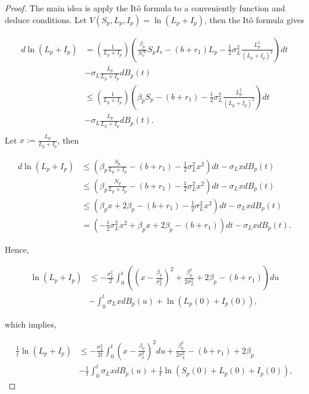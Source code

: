 \begin{proof}
	The main idea is apply the It\^{o} formula to a conveniently function and deduce conditions. Let $V(S_p,L_p,I_p)=\ln(L_p+I_p)$, then the It\^{o} formula gives
	
		\begin{align*}
			d \ln(L_p+I_p) 
				&=
					\left(\frac{1}{L_p+I_p}\right)\left(\frac{\beta_p}{N_v^\infty} S_p I_v-(b+r_1)L_p-\frac{1}{2}\sigma_L^2\frac{L_p^2}{(L_p+I_p)^2}\right)dt\\
				&-
					\sigma_L \frac{L_p}{L_p+I_p}dB_p(t)\\
				&\leq 
					\left(\frac{1}{L_p+I_p}\right)\left(\beta_p S_p-(b+r_1)-\frac{1}{2}\sigma_L^2\frac{L_p^2}{(L_p+I_p)^2}\right)dt\\
				&-
					\sigma_L \frac{L_p}{L_p+I_p}dB_p(t).\\
		\end{align*}
	Let $x:=\frac{L_p}{L_p+I_p}$, then
	
	\begin{align*}
		d \ln(L_p+I_p) 
			&\leq 
				\left(\beta_p\frac{S_p}{L_p+I_p}-(b+r_1)-\frac{1}{2}\sigma_L^2x^2\right)dt-\sigma_L xdB_p(t)\\
			&\leq
				\left(\beta_p\frac{N_p}{L_p+I_p}-(b+r_1)-\frac{1}{2}\sigma_L^2x^2\right)dt-\sigma_L xdB_p(t)\\
			&\leq
				\left(\beta_px+2\beta_p-(b+r_1)-\frac{1}{2}\sigma_L^2x^2\right)dt-\sigma_L xdB_p(t)\\
			&=
				\left(-\frac{1}{2}\sigma_L^2x^2+\beta_px+2\beta_p-(b+r_1)\right)dt-\sigma_L xdB_p(t).			
	\end{align*}
	
	Hence,
	
	\begin{align*}
		\ln(L_p+I_p)
			&\leq
				-\frac{\sigma_L^2}{2}\int_{0}^{t}\left(\left(x-\frac{\beta_p}{\sigma_L^2}\right)^2 +\frac{\beta_p^2}{2\sigma_L^2}+2\beta_p-(b+r_1)\right)du\\
			&-
				\int_{0}^{t}\sigma_L xdB_p(u)+\ln(L_p(0)+I_p(0)),
	\end{align*}
	
	which implies,
	
		\begin{align}\label{eq4.1}
			\frac{1}{t}\ln(L_p+I_p) 
				&\leq
					-\frac{\sigma_L^2}{2t}\int_{0}^{t}\left(x-\frac{\beta_p}{\sigma_L^2}\right)^2du+
					\frac{\beta_p^2}{2\sigma_L^2}-(b+r_1)+2\beta_p\nonumber\\
				&-
					\frac{1}{t}\int_{0}^{t}\sigma_L xdB_p(u)+\frac{1}{t}\ln(S_p(0)+L_p(0)+I_p(0)),
		\end{align}
	

\end{proof}
